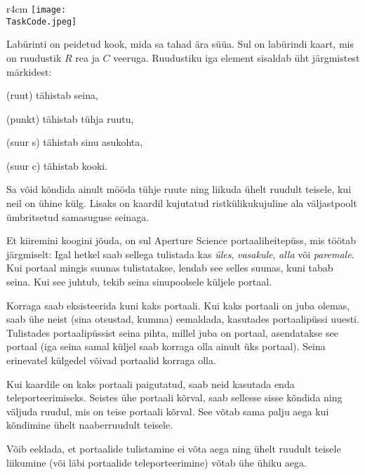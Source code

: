 \documentclass{boi2014-et}
\renewcommand{\TaskCode}{portals}
\newcommand{\constant}[1]{{\tt #1}}
\begin{document}
    \begin{wrapfigure}[4]{r}{4cm}
        \vspace{-24pt}
        \texttt{[image: \\TaskCode.jpeg]}
    \end{wrapfigure}

    Labürinti on peidetud kook, mida sa tahad ära süüa.
    Sul on labürindi kaart, mis on ruudustik $R$ rea ja $C$ veeruga.
    Ruudustiku iga element sisaldab üht järgmistest märkidest:
    \begin{description}[itemindent=1pt]
        \item[\constant{\#}] (ruut) tähistab seina,
        \item[\constant{.}] (punkt) tähistab tühja ruutu,
        \item[\constant{S}] (suur s) tähistab sinu asukohta,
        \item[\constant{C}] (suur c) tähistab kooki.
    \end{description}

    Sa võid kõndida ainult mööda tühje ruute ning liikuda ühelt ruudult teisele,
    kui neil on ühine külg. Lisaks on kaardil kujutatud ristkülikukujuline ala
    väljastpoolt ümbritsetud samasuguse seinaga.

    Et kiiremini koogini jõuda, on sul Aperture Science\texttrademark{}
    portaaliheitepüss, mis töötab järgmiselt:
    Igal hetkel saab sellega tulistada kas
    \emph{üles}, \emph{vasakule}, \emph{alla} või \emph{paremale}.
    Kui portaal mingis suunas tulistatakse, lendab see selles suunas, kuni tabab seina.
    Kui see juhtub, tekib seina sinupoolsele küljele portaal.

    Korraga saab eksisteerida kuni kaks portaali. Kui kaks portaali on juba olemas,
    saab ühe neist (sina otsustad, kumma) eemaldada, kasutades portaalipüssi uuesti.
    Tulistades portaalipüssist seina pihta, millel juba on portaal, asendatakse see portaal
    (iga seina samal küljel saab korraga olla ainult üks portaal).
    Seina erinevatel külgedel võivad portaalid korraga olla.

    Kui kaardile on kaks portaali paigutatud, saab neid kasutada enda teleporteerimiseks.
    Seistes ühe portaali kõrval, saab sellesse sisse kõndida ning väljuda ruudul,
    mis on teise portaali kõrval. See võtab sama palju aega kui kõndimine ühelt naaberruudult teisele.

    Võib eeldada, et portaalide tulistamine ei võta aega ning ühelt ruudult teisele liikumine
    (või läbi portaalide teleporteerimine) võtab ühe ühiku aega.
\end{document}
